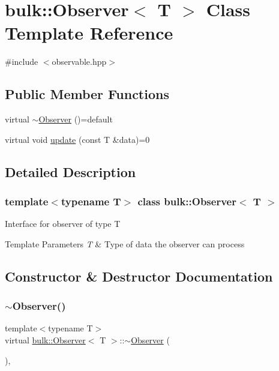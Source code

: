 \hypertarget{classbulk_1_1Observer}{}\section{bulk\+:\+:Observer$<$ T $>$ Class Template Reference}
\label{classbulk_1_1Observer}


{\ttfamily \#include $<$observable.\+hpp$>$}

\subsection*{Public Member Functions}
\begin{DoxyCompactItemize}
\item 
virtual \hyperlink{classbulk_1_1Observer_a64cb6e08300f80ab54b2417f45f57396}{$\sim$\+Observer} ()=default
\item 
virtual void \hyperlink{classbulk_1_1Observer_af17104660bf8b287e467213c4efbee2e}{update} (const T \&data)=0
\end{DoxyCompactItemize}


\subsection{Detailed Description}
\subsubsection*{template$<$typename T$>$\newline
class bulk\+::\+Observer$<$ T $>$}

Interface for observer of type T 
\begin{DoxyTemplParams}{Template Parameters}
{\em T} & Type of data the observer can process \\
\hline
\end{DoxyTemplParams}


\subsection{Constructor \& Destructor Documentation}
\mbox{\label{classbulk_1_1Observer_a64cb6e08300f80ab54b2417f45f57396}} 
\subsubsection{\texorpdfstring{$\sim$\+Observer()}{~Observer()}}
{\footnotesize\ttfamily template$<$typename T$>$ \\
virtual \hyperlink{classbulk_1_1Observer}{bulk\+::\+Observer}$<$ T $>$\+::$\sim$\hyperlink{classbulk_1_1Observer}{Observer} (\begin{DoxyParamCaption}{ }\end{DoxyParamCaption})\hspace{0.3cm}{\ttfamily [virtual]}, {\ttfamily [default]}}



